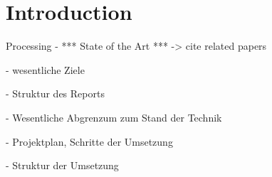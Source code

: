 \section{Introduction}
 Processing
- *** State of the Art *** -> cite related papers

- wesentliche Ziele

- Struktur des Reports

- Wesentliche Abgrenzum zum Stand der Technik

- Projektplan, Schritte der Umsetzung

- Struktur der Umsetzung
